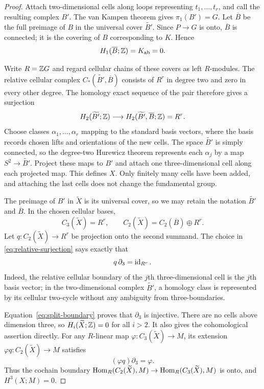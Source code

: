 \begin{proof}
Attach two-dimensional cells along loops representing $t_1,\ldots,t_r$,
and call the resulting complex $B'$. The van Kampen theorem gives
$\pi_1(B')=G$. Let $\overline B$ be the full preimage of $B$ in the
universal cover $\widetilde{B'}$. Since $P\to G$ is onto,
$\overline B$ is connected; it is the covering of $B$ corresponding
to $K$. Hence
\[
 H_1(\overline B;\mathbb Z)=K_{\mathrm{ab}}=0.
\]

Write $R=\mathbb Z G$ and regard cellular chains of these covers as left
$R$-modules. The relative cellular complex
$C_*(\widetilde{B'},\overline B)$ consists of $R^r$ in degree two
and zero in every other degree. The homology exact sequence of the
pair therefore gives a surjection
\begin{equation}\label{eq:relative-surjection}
 H_2(\widetilde{B'};\mathbb Z)
 \longrightarrow H_2(\widetilde{B'},\overline B;\mathbb Z)=R^r.
\end{equation}
Choose classes $\alpha_1,\ldots,\alpha_r$ mapping to the standard
basis vectors, where the basis records chosen lifts and orientations
of the new cells. The space $\widetilde{B'}$ is simply connected, so
the degree-two Hurewicz theorem represents each $\alpha_j$ by a map
$S^2\to\widetilde{B'}$. Project these maps to $B'$ and attach one
three-dimensional cell along each projected map. This defines $X$.
Only finitely many cells have been added, and attaching the last cells
does not change the fundamental group.

The preimage of $B'$ in $\widetilde X$ is its universal cover, so we
may retain the notation $\widetilde{B'}$ and $\overline B$. In the
chosen cellular bases,
\[
 C_3(\widetilde X)=R^r,
 \qquad C_2(\widetilde X)=C_2(\overline B)\oplus R^r.
\]
Let $q:C_2(\widetilde X)\to R^r$ be projection onto the second
summand. The choice in \eqref{eq:relative-surjection} says exactly that
\begin{equation}\label{eq:split-boundary}
 q\,\partial_3=\operatorname{id}_{R^r}.
\end{equation}
Indeed, the relative cellular boundary of the $j$th three-dimensional
cell is the $j$th basis vector; in the two-dimensional complex
$\widetilde{B'}$, a homology class is represented by its cellular
two-cycle without any ambiguity from three-boundaries.

Equation~\eqref{eq:split-boundary} proves that $\partial_3$ is
injective. There are no cells above dimension three, so
$H_i(\widetilde X;\mathbb Z)=0$ for all $i>2$. It also gives the
cohomological assertion directly. For any $R$-linear map
$\varphi:C_3(\widetilde X)\to M$, its extension
$\varphi q:C_2(\widetilde X)\to M$ satisfies
\[
 (\varphi q)\partial_3=\varphi.
\]
Thus the cochain boundary
$\operatorname{Hom}_R(C_2(\widetilde X),M)\to\operatorname{Hom}_R(C_3(\widetilde X),M)$
is onto, and $H^3(X;M)=0$.


\end{proof}
